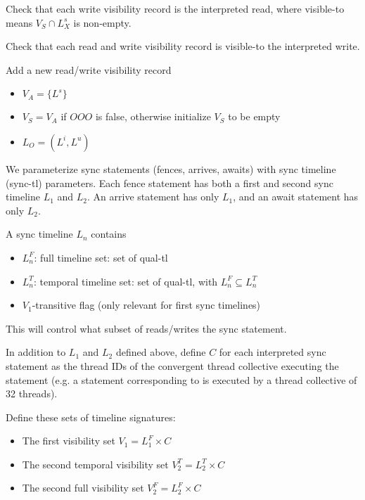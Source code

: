  Check that each write visibility record is  the interpreted read, where visible-to means $V_S \cap L_X^s$ is non-empty.

 Check that each read and write visibility record is visible-to the interpreted write.

 Add a new read/write visibility record
\begin{itemize}
  \item $V_A = \{ L^s \}$
  \filbreak
  \item $V_S = V_A$ if $OOO$ is false, otherwise initialize $V_S$ to be empty
  \filbreak
  \item $L_O = (L^i, L^u)$
\end{itemize}

\filbreak
{}

We parameterize sync statements (fences, arrives, awaits) with sync timeline (sync-tl) parameters.
Each fence statement has both a first and second sync timeline $L_1$ and $L_2$.
An arrive statement has only $L_1$, and an await statement has only $L_2$.

A sync timeline $L_n$ contains
\begin{itemize}
  \item $L_n^F$: full timeline set: set of qual-tl
  \filbreak
  \item $L_n^T$: temporal timeline set: set of qual-tl, with $L_n^F \subseteq L_n^T$
  \filbreak
  \item $V_1$-transitive flag (only relevant for first sync timelines)
\end{itemize}
\filbreak
This will control what subset of reads/writes  the sync statement.

\filbreak
{}

In addition to $L_1$ and $L_2$ defined above, define $C$ for each interpreted sync statement as the thread IDs of the convergent thread collective executing the statement (e.g. a statement corresponding to  is executed by a thread collective of 32 threads).

\filbreak
Define these sets of timeline signatures:
\begin{itemize}
  \item The first visibility set $V_1 = L_1^F \times C$
  \item The second temporal visibility set $V_2^T = L_2^T \times C$
  \item The second full visibility set $V_2^F = L_2^F \times C$
\end{itemize}

